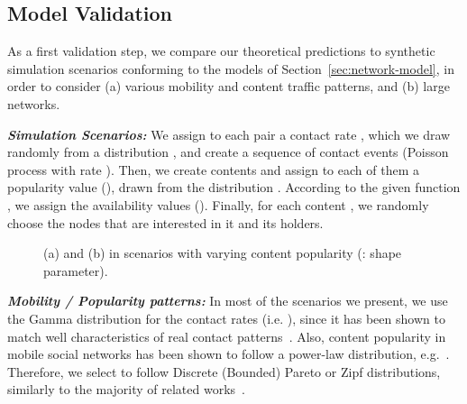 \documentclass[journal]{IEEEtran}
\begin{document}
\subsection{Model Validation}\label{sec:synthetic-simulations}

As a first validation step, we compare our theoretical predictions to synthetic simulation scenarios conforming to the models of Section~\ref{sec:network-model}, in order to consider (a) various mobility and content traffic patterns, and (b) large networks. 

\textit{\textbf{Simulation Scenarios:}} We assign to each pair  a contact rate , which we draw randomly from a distribution , and create a sequence of contact events (Poisson process with rate ). Then, we create  contents and assign to each of them a popularity value (), drawn from the distribution . According to the given function , we assign the availability values (). Finally, for each content , we randomly choose the  nodes that are interested in it and its  holders. 

\begin{figure}
\centering
{}
\caption{(a)  and (b)  in scenarios with varying content popularity (: shape parameter).}
\label{fig:synth-gLinear}
\end{figure}


\textit{\textbf{Mobility / Popularity patterns:}} In most of the scenarios we present, we use the Gamma distribution for the contact rates (i.e. ), since it has been shown to match well characteristics of real contact patterns~\cite{Passarella-aggregateIT}. Also, content popularity in mobile social networks has been shown to follow a power-law distribution, e.g.~\cite{youtube-traffic-from-edge, RSS-traffic-characteristics, pavlos-dataset-AOC}. Therefore, we select  to follow Discrete (Bounded) Pareto or Zipf distributions, similarly to the majority of related works~\cite{Gao-user-centric-DTN,multiple-offloading,CEDO}.
\end{document}
